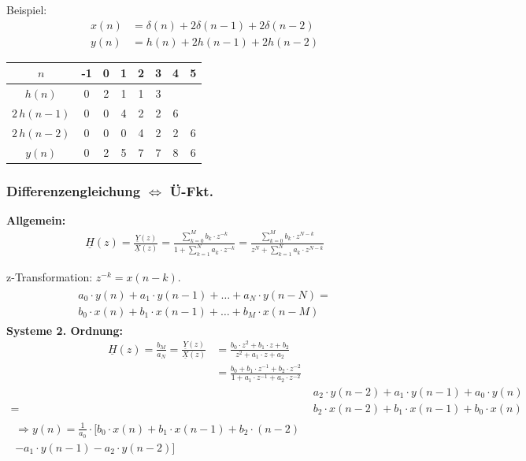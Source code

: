 Beispiel:
\begin{align*}
	x(n)&=\delta(n)+2\delta(n-1)+2\delta(n-2)\\
	y(n)&=h(n)+2h(n-1)+2h(n-2)
\end{align*}

\begin{center}
	\begin{tabular}{|c|c|c|c|c|c|c|c|}
	\hline
	$n$ & -1 & 0 & 1 & 2 & 3 & 4 & 5  \\
	\toprule
	\hline
	$h(n)$ & 0 & 2 & 1 & 1 & 3 &  &  \\
	\hline
	$2\,h(n-1)$ & 0 & 0 & 4 & 2 & 2 & 6 & \\
	\hline
	$2\,h(n-2)$ & 0 & 0 & 0 & 4 & 2 & 2 & 6\\
	\hline
	\bottomrule
	$y(n)$ & 0 & 2 & 5 & 7 & 7 & 8  & 6 \\
	\hline
\end{tabular}
\end{center}
\subsubsection{Differenzengleichung $\Leftrightarrow$ Ü-Fkt.}
\textbf{Allgemein:}
\begin{gather*}
	\underline{H}(z)=\frac{\underline{Y}(z)}{\underline{X}(z)}=\frac{\sum_{k=0}^{M} b_{k} \cdot z^{-k}}{1+\sum_{k=1}^{N} a_{k} \cdot z^{-k}}=\frac{\sum_{k=0}^{M} b_{k} \cdot z^{N-k}}{z^{N}+\sum_{k=1}^{N} a_{k} \cdot z^{N-k}}
\end{gather*}

z-Transformation: $z^{-k} = x(n-k)$.
\begin{align*}
	\begin{split}
		a_{0} \cdot y(n)+a_{1} \cdot y(n-1)+\ldots+a_{N} \cdot y(n-N)=\\
		b_{0} \cdot x(n)+b_{1}  \cdot x(n-1)+\ldots+b_{M} \cdot x(n-M)
	\end{split}
\end{align*}
\textbf{Systeme 2. Ordnung:}
\begin{align*}
			\underline{H}(z)  =  \frac{b_M}{a_N}=\frac{\underline{Y}(z)}{\underline{X}(z)} &= \frac{b_0 \cdot z^{2} + b_1 \cdot z + b_2}{z^{2}+a_1 \cdot z + a_2}\\
			 &= \frac{b_0 + b_1 \cdot z^{-1} + b_2 \cdot z^{-2}}{1 + a_1 \cdot z^{-1} + a_2 \cdot  z^{-2}}
\end{align*}
\begin{align*}
		 & a_2 \cdot y(n-2) + a_1 \cdot y(n-1) + a_0 \cdot y(n)\\ 
		 =\, & b_2 \cdot x(n-2) + b_1 \cdot x(n-1) + b_0 \cdot x(n)\\
		 \begin{split}
		 \Rightarrow y(n) = \frac{1}{a_0} \cdot [ b_0 \cdot x(n) + b_1 \cdot x(n-1) + b_2 \cdot (n-2) \\ - a_1 \cdot y(n-1) - a_2 \cdot y(n-2)]
		 \end{split}
\end{align*}

